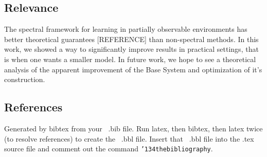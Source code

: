\documentclass{acm_proc_article-sp}
\begin{document}
\subsection{Relevance}
The spectral framework for learning in partially observable environments has better theoretical guarantees [REFERENCE] than non-spectral methods. In this work, we showed a way to significantly improve results in practical settings, that is when one wants a smaller model. In future work, we hope to see a theoretical analysis of the apparent improvement of the Base System and optimization of it's construction.

%

%
\subsection{References}
Generated by bibtex from your ~.bib file.  Run latex,
then bibtex, then latex twice (to resolve references)
to create the ~.bbl file.  Insert that ~.bbl file into
the .tex source file and comment out
the command \texttt{{\char'134}thebibliography}.
\end{document}
